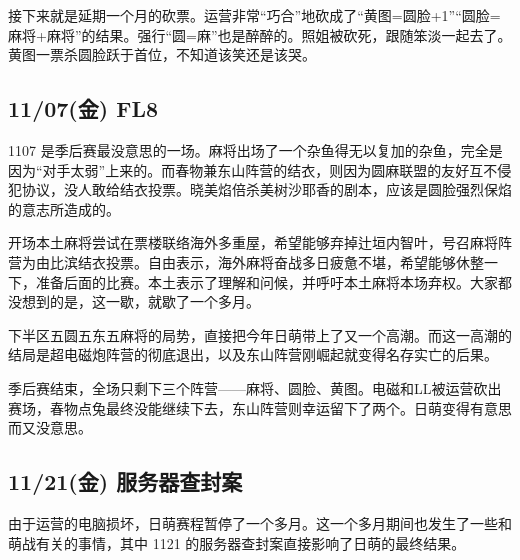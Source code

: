 接下来就是延期一个月的砍票。运营非常“巧合”地砍成了“黄图=圆脸+1”“圆脸=麻将+麻将”的结果。强行“圆=麻”也是醉醉的。照姐被砍死，跟随笨淡一起去了。黄图一票杀圆脸跃于首位，不知道该笑还是该哭。

\subsection{11/07(金) FL8}


1107 是季后赛最没意思的一场。麻将出场了一个杂鱼得无以复加的杂鱼，完全是因为“对手太弱”上来的。而春物兼东山阵营的结衣，则因为圆麻联盟的友好互不侵犯协议，没人敢给结衣投票。晓美焰倍杀美树沙耶香的剧本，应该是圆脸强烈保焰的意志所造成的。

开场本土麻将尝试在票楼联络海外多重屋，希望能够弃掉辻垣内智叶，号召麻将阵营为由比滨结衣投票。自由表示，海外麻将奋战多日疲惫不堪，希望能够休整一下，准备后面的比赛。本土表示了理解和问候，并呼吁本土麻将本场弃权。大家都没想到的是，这一歇，就歇了一个多月。

下半区五圆五东五麻将的局势，直接把今年日萌带上了又一个高潮。而这一高潮的结局是超电磁炮阵营的彻底退出，以及东山阵营刚崛起就变得名存实亡的后果。

季后赛结束，全场只剩下三个阵营——麻将、圆脸、黄图。电磁和LL被运营砍出赛场，春物点兔最终没能继续下去，东山阵营则幸运留下了两个。日萌变得有意思而又没意思。

\subsection{11/21(金) 服务器查封案}

由于运营的电脑损坏，日萌赛程暂停了一个多月。这一个多月期间也发生了一些和萌战有关的事情，其中 1121 的服务器查封案直接影响了日萌的最终结果。

